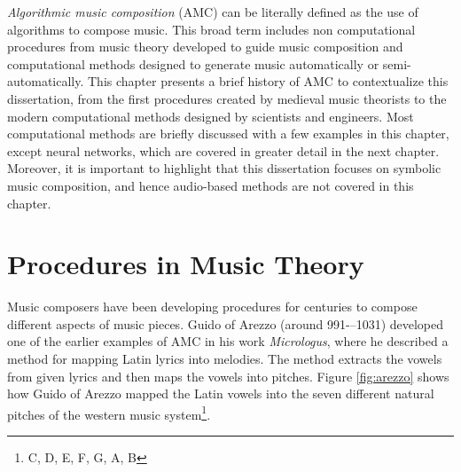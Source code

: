\textit{Algorithmic music composition} (AMC) can be literally defined as the use of algorithms to compose music. This broad term includes non computational procedures from music theory developed to guide music composition and computational methods designed to generate music automatically or semi-automatically. This chapter presents a brief history of AMC to contextualize this dissertation, from the first procedures created by medieval music theorists to the modern computational methods designed by scientists and engineers. Most computational methods are briefly discussed with a few examples in this chapter, except neural networks, which are covered in greater detail in the next chapter. Moreover, it is important to highlight that this dissertation focuses on symbolic music composition, and hence audio-based methods are not covered in this chapter.

\section{Procedures in Music Theory}

Music composers have been developing procedures for centuries to compose different aspects of music pieces. Guido of Arezzo (around 991-–1031) developed one of the earlier examples of AMC in his work \textit{Micrologus}, where he described a method for mapping Latin lyrics into melodies. The method extracts the vowels from given lyrics and then maps the vowels into pitches. Figure \ref{fig:arezzo} shows how Guido of Arezzo mapped the Latin vowels into the seven different natural pitches of the western music system\footnote{C, D, E, F, G, A, B}.

